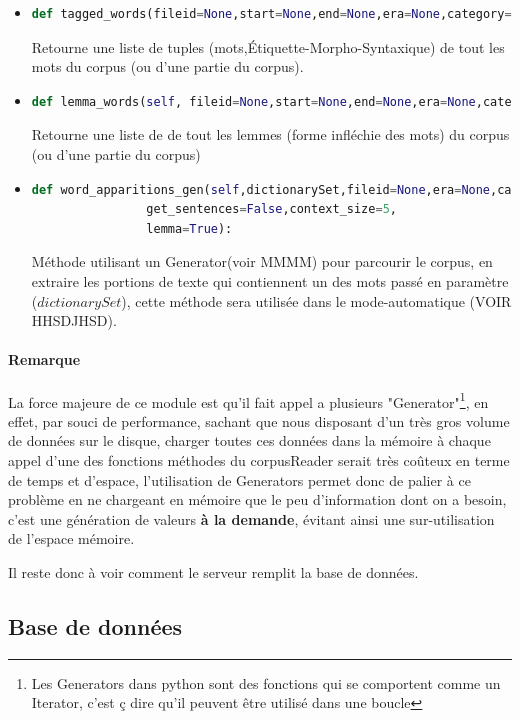 \documentclass[]{report}
\begin{document}
\begin{itemize}
				\item 
				\begin{lstlisting}[language=python]
				def tagged_words(fileid=None,start=None,end=None,era=None,category=None):\end{lstlisting}
				Retourne une liste de tuples (mots,Étiquette-Morpho-Syntaxique) de tout les mots du corpus (ou d'une partie du corpus).
				
				\item 
				\begin{lstlisting}[language=python]
				def lemma_words(self, fileid=None,start=None,end=None,era=None,category=None):\end{lstlisting}
				Retourne une liste de de tout les lemmes (forme infléchie des mots) du corpus (ou d'une partie du corpus) 
				
				\item 
				\begin{lstlisting}[language=python]
				def word_apparitions_gen(self,dictionarySet,fileid=None,era=None,category=None,stop_words=None,
				get_sentences=False,context_size=5,
				lemma=True):\end{lstlisting}
				Méthode utilisant un Generator(voir MMMM) pour parcourir le corpus, en extraire les portions de texte qui contiennent un des mots passé en paramètre (\(dictionarySet\)), cette méthode sera utilisée dans le mode-automatique (VOIR HHSDJHSD).
			\end{itemize}
			\paragraph{Remarque}
			La force majeure de ce module est qu'il fait appel a plusieurs "Generator"\footnote{Les Generators dans python sont des fonctions qui se comportent comme un Iterator, c'est ç dire qu'il peuvent être utilisé dans une boucle}, en effet, par souci de performance, sachant que nous disposant d'un très gros volume de données sur le disque, charger toutes ces données dans la mémoire à chaque appel d'une des fonctions méthodes du corpusReader serait très coûteux en terme de temps
			et d'espace, l'utilisation de Generators permet donc de palier à ce problème en ne chargeant en mémoire que le peu d'information dont on a besoin, c'est une génération de valeurs \textbf{à la demande}, évitant ainsi une sur-utilisation de l'espace mémoire.
			
			\par
			Il reste donc à voir comment le serveur remplit la base de données. 
		\subsection{Base de données}
\end{document}
